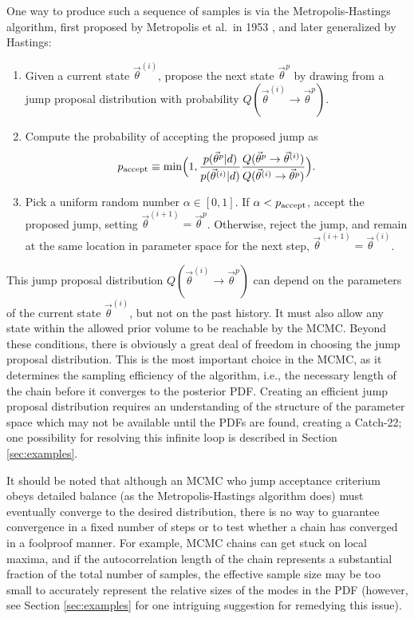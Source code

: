 \documentclass[prd,preprint]{revtex4}
\newcommand{\vtheta}{\vec{\theta}}
\newcommand{\ee}{\end{equation}}
\newcommand{\bel}[1]{\begin{equation}\label{#1}}
\begin{document}
One way to produce such a sequence of samples is via the Metropolis-Hastings algorithm, first proposed by Metropolis et al.~in 1953 \cite{Metropolis:1953}, and later generalized by Hastings:
\begin{enumerate}
  \item Given a current state $\vtheta^{(i)}$, propose the next state $\vtheta^p$ by drawing from a jump proposal distribution with probability $Q(\vtheta^{(i)} \to \vtheta^p)$.  
  \item Compute the probability of accepting the proposed jump as
\bel{eq:p-accept}
p_{\textnormal{accept}}  \equiv \min\Bigl(1,  \frac{p(\vtheta^p|d)}{p(\vtheta^{(i)}|d)} \frac{Q(\vtheta^p \to
        \vtheta^{(i)})}{Q(\vtheta^{(i)} \to \vtheta^p)} \Bigr).
\ee
\item Pick a uniform random number $\alpha \in [0,1]$.  If $\alpha<  p_{\textnormal{accept}}$, accept the proposed jump, setting $\vtheta^{(i+1)}=\vtheta^p$.  Otherwise, reject the jump, and remain at the same location in parameter space for the next step, $\vtheta^{(i+1)}=\vtheta^{(i)}$.
 \end{enumerate}
 
This jump proposal distribution $Q(\vtheta^{(i)} \to \vtheta^p)$ can depend on the parameters of the current state $\vtheta^{(i)}$, but not on the past history.  It must also allow any state within the allowed prior volume to be reachable by the MCMC.  Beyond these conditions, there is obviously a great deal of freedom in choosing the jump proposal distribution.  This is the most important choice in the MCMC, as it determines the sampling efficiency of the algorithm, i.e., the necessary length of the chain before it converges to the posterior PDF.  Creating an efficient jump proposal distribution requires an understanding of the structure of the parameter space which may not be available until the PDFs are found, creating a Catch-22; one possibility for resolving this infinite loop is described in Section \ref{sec:examples}.

It should be noted that although an MCMC who jump acceptance criterium obeys detailed balance (as the Metropolis-Hastings algorithm does) must eventually converge to the desired distribution, there is no way to guarantee convergence in a fixed number of steps or to test whether a chain has converged in a foolproof manner.  For example, MCMC chains can get stuck on local maxima, and if the autocorrelation length of the chain represents a substantial fraction of the total number of samples, the effective sample size may be too small to accurately represent the relative sizes of the modes in the PDF (however, see Section \ref{sec:examples} for one intriguing suggestion for remedying this issue).   
\end{document}
